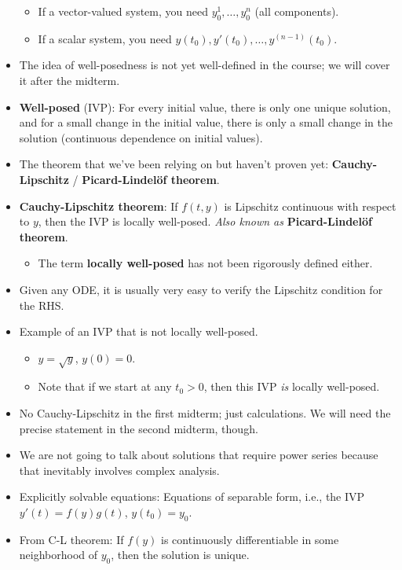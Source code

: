 \documentclass[../notes.tex]{subfiles}
\begin{document}
\begin{itemize}
    \begin{itemize}
        \item If a vector-valued system, you need $y_0^1,\dots,y_0^n$ (all components).
        \item If a scalar system, you need $y(t_0),y'(t_0),\dots,y^{(n-1)}(t_0)$.
    \end{itemize}
    \item The idea of well-posedness is not yet well-defined in the course; we will cover it after the midterm.
    \item \textbf{Well-posed} (IVP): For every initial value, there is only one unique solution, and for a small change in the initial value, there is only a small change in the solution (continuous dependence on initial values).
    \item The theorem that we've been relying on but haven't proven yet: \textbf{Cauchy-Lipschitz} / \textbf{Picard-Lindel\"{o}f theorem}.
    \item \textbf{Cauchy-Lipschitz theorem}: If $f(t,y)$ is Lipschitz continuous with respect to $y$, then the IVP is locally well-posed. \emph{Also known as} \textbf{Picard-Lindel\"{o}f theorem}.
    \begin{itemize}
        \item The term \textbf{locally well-posed} has not been rigorously defined either.
    \end{itemize}
    \item Given any ODE, it is usually very easy to verify the Lipschitz condition for the RHS.
    \item Example of an IVP that is not locally well-posed.
    \begin{itemize}
        \item $y=\sqrt{y}$, $y(0)=0$.
        \item Note that if we start at any $t_0>0$, then this IVP \emph{is} locally well-posed.
    \end{itemize}
    \item No Cauchy-Lipschitz in the first midterm; just calculations. We will need the precise statement in the second midterm, though.
    \item We are not going to talk about solutions that require power series because that inevitably involves complex analysis.
    \item Explicitly solvable equations: Equations of separable form, i.e., the IVP $y'(t)=f(y)g(t)$, $y(t_0)=y_0$.
    \item From C-L theorem: If $f(y)$ is continuously differentiable in some neighborhood of $y_0$, then the solution is unique.

\end{itemize}
\end{document}
